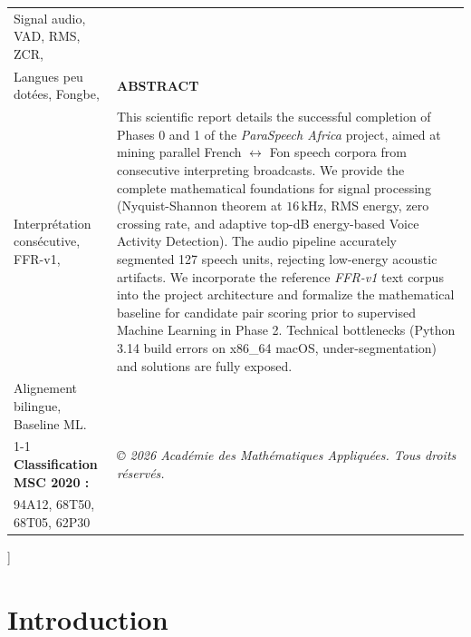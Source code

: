 \documentclass[10pt,a4paper,twocolumn]{article}
\begin{document}
{{\begin{minipage}{0.98\textwidth}
\begin{tabularx}{\textwidth}{p{4.8cm}|X}
\footnotesize Signal audio, VAD, RMS, ZCR, & \\
\footnotesize Langues peu dotées, Fongbe, & \footnotesize \textbf{ABSTRACT} \\
\footnotesize Interprétation consécutive, FFR-v1, & \footnotesize This scientific report details the successful completion of Phases 0 and 1 of the \textit{ParaSpeech Africa} project, aimed at mining parallel French $\longleftrightarrow$ Fon speech corpora from consecutive interpreting broadcasts. We provide the complete mathematical foundations for signal processing (Nyquist-Shannon theorem at $16\,\text{kHz}$, RMS energy, zero crossing rate, and adaptive top-dB energy-based Voice Activity Detection). The audio pipeline accurately segmented 127 speech units, rejecting low-energy acoustic artifacts. We incorporate the reference \textit{FFR-v1} text corpus into the project architecture and formalize the mathematical baseline for candidate pair scoring prior to supervised Machine Learning in Phase 2. Technical bottlenecks (Python 3.14 build errors on x86\_64 macOS, under-segmentation) and solutions are fully exposed.\\
\footnotesize Alignement bilingue, Baseline ML. & \\
\cmidrule{1-1}
\footnotesize \textbf{Classification MSC 2020 :} & \hfill \textit{\scriptsize \copyright{} 2026 Académie des Mathématiques Appliquées. Tous droits réservés.} \\
\footnotesize 94A12, 68T50, 68T05, 62P30 & \\
\end{tabularx}
\vspace{0.15cm}
\end{minipage}%
}
\vspace{0.45cm}
}]

{
\renewcommand{\thefootnote}{\fnsymbol{footnote}}
}

\section{Introduction}
\end{document}
